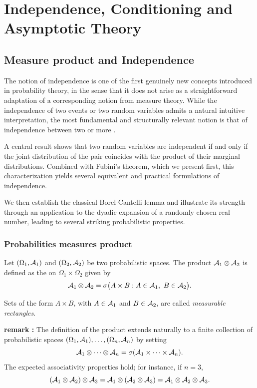 \documentclass[../Main.tex]{subfiles}
\begin{document}
\chapter{Independence, Conditioning and Asymptotic Theory}


\section{ Measure product and Independence} \label{sec:measure_product_and_independence}
The notion of independence is one of the first genuinely new concepts introduced in probability theory, in the sense that it does not arise as a straightforward adaptation of a corresponding notion from measure theory. While the independence of two events or two random variables admits a natural intuitive interpretation, the most fundamental and structurally relevant notion is that of independence between two or more \sfields.

A central result shows that two random variables are independent if and only if the joint distribution of the pair coincides with the product of their marginal distributions. Combined with Fubini's theorem, which we present first, this characterization yields several equivalent and practical formulations of independence.

We then establish the classical Borel-Cantelli lemma and illustrate its strength through an application to the dyadic expansion of a randomly chosen real number, leading to several striking probabilistic properties.

\subsection{Probabilities measures product}
Let $(\measspace[1])$ and $(\measspace[2])$ be two probabilistic spaces. The product \sfield $\A_1\otimes\A_2$ is defined as the \sfield on $\Omega_1\times\Omega_2$ given by
\[ \A_1\otimes\A_2 = \sigma\bigl(A\times B : A\in\A_1,\ B\in\A_2\bigr). \]

Sets of the form $A\times B$, with $A\in\A_1$ and $B\in\A_2$, are called \emph{measurable rectangles}. 

\textbf{remark :} The definition of the product \sfield extends naturally to a finite collection of probabilistic spaces $(\Omega_1,\A_1),\dots,(\Omega_n,\A_n)$ by setting
\[ \A_1\otimes\cdots\otimes\A_n = \sigma(\A_1\times\cdots\times\A_n). \]
The expected associativity properties hold; for instance, if $n=3$,
\[ (\A_1\otimes\A_2)\otimes\A_3 = \A_1\otimes(\A_2\otimes\A_3) = \A_1\otimes\A_2\otimes\A_3. \]
\end{document}

